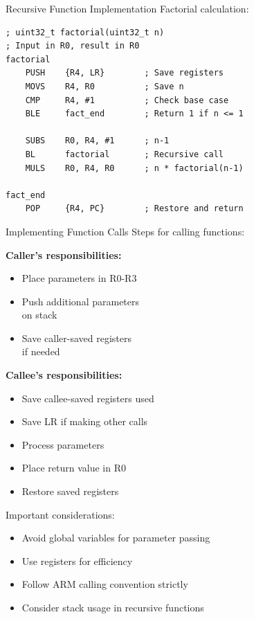 \begin{example2}{Recursive Function Implementation}
Factorial calculation:
\begin{lstlisting}[language=armasm, style=basesmol]
; uint32_t factorial(uint32_t n)
; Input in R0, result in R0
factorial
    PUSH    {R4, LR}        ; Save registers
    MOVS    R4, R0          ; Save n
    CMP     R4, #1          ; Check base case
    BLE     fact_end        ; Return 1 if n <= 1
    
    SUBS    R0, R4, #1      ; n-1
    BL      factorial       ; Recursive call
    MULS    R0, R4, R0      ; n * factorial(n-1)
    
fact_end
    POP     {R4, PC}        ; Restore and return
\end{lstlisting}
\end{example2}

\begin{KR}{Implementing Function Calls}
Steps for calling functions:

\begin{minipage}[t]{0.5\textwidth}
  \textbf{Caller's responsibilities:}
    \begin{itemize}
      \item Place parameters in R0-R3
      \item Push additional parameters \\on stack
      \item Save caller-saved registers \\if needed
    \end{itemize}
\end{minipage}
\begin{minipage}[t]{0.5\textwidth}  
  \textbf{Callee's responsibilities:}
    \begin{itemize}
      \item Save callee-saved registers used
      \item Save LR if making other calls
      \item Process parameters
      \item Place return value in R0
      \item Restore saved registers
    \end{itemize}
\end{minipage}
\end{KR}

\begin{remark}
Important considerations:
\begin{itemize}
  \item Avoid global variables for parameter passing
  \item Use registers for efficiency
  \item Follow ARM calling convention strictly
  \item Consider stack usage in recursive functions
\end{itemize}
\end{remark}

